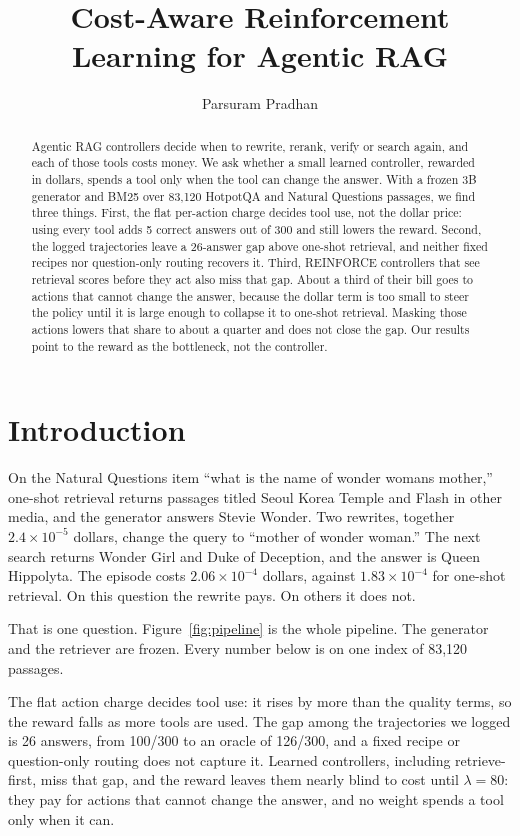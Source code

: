 \documentclass[letterpaper]{article} %
\title{Cost-Aware Reinforcement Learning for Agentic RAG}
\author{Parsuram Pradhan}
\begin{document}
\maketitle

\begin{abstract}
Agentic RAG controllers decide when to rewrite, rerank, verify or search again, and each of those tools costs money. We ask whether a small learned controller, rewarded in dollars, spends a tool only when the tool can change the answer. With a frozen 3B generator and BM25 over 83{,}120 HotpotQA and Natural Questions passages, we find three things. First, the flat per-action charge decides tool use, not the dollar price: using every tool adds 5 correct answers out of 300 and still lowers the reward. Second, the logged trajectories leave a 26-answer gap above one-shot retrieval, and neither fixed recipes nor question-only routing recovers it. Third, REINFORCE controllers that see retrieval scores before they act also miss that gap. About a third of their bill goes to actions that cannot change the answer, because the dollar term is too small to steer the policy until it is large enough to collapse it to one-shot retrieval. Masking those actions lowers that share to about a quarter and does not close the gap. Our results point to the reward as the bottleneck, not the controller.
\end{abstract}

\section{Introduction}
On the Natural Questions item ``what is the name of wonder womans mother,'' one-shot retrieval returns passages titled Seoul Korea Temple and Flash in other media, and the generator answers Stevie Wonder. Two rewrites, together \(2.4\times 10^{-5}\) dollars, change the query to ``mother of wonder woman.'' The next search returns Wonder Girl and Duke of Deception, and the answer is Queen Hippolyta. The episode costs \(2.06\times 10^{-4}\) dollars, against \(1.83\times 10^{-4}\) for one-shot retrieval. On this question the rewrite pays. On others it does not.

That is one question. Figure~\ref{fig:pipeline} is the whole pipeline. The generator and the retriever are frozen. Every number below is on one index of 83{,}120 passages.

The flat action charge decides tool use: it rises by more than the quality terms, so the reward falls as more tools are used. The gap among the trajectories we logged is 26 answers, from 100/300 to an oracle of 126/300, and a fixed recipe or question-only routing does not capture it. Learned controllers, including retrieve-first, miss that gap, and the reward leaves them nearly blind to cost until \(\lambda{=}80\): they pay for actions that cannot change the answer, and no weight spends a tool only when it can.
\end{document}
